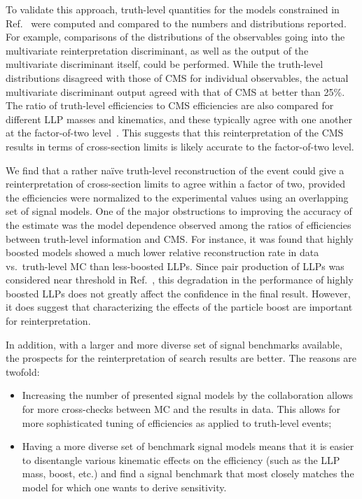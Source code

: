 To validate this approach, truth-level quantities for the models constrained in
Ref.~\cite{CMS-PAS-EXO-12-038} were computed and compared to the numbers and
distributions reported. For example,
comparisons of the distributions of the observables going into the multivariate reinterpretation
discriminant, as well as the output of the multivariate discriminant itself, could be
performed. While the truth-level distributions disagreed with those of CMS for
individual observables, the actual multivariate discriminant output agreed with
that of CMS at better than 25\%. The ratio of truth-level efficiencies to CMS
efficiencies are also compared for different LLP masses and kinematics, and
these typically agree with one another at the factor-of-two
level~\cite{Cui:2014twa}. This suggests that this reinterpretation of the CMS
results in terms of cross-section limits is likely accurate to the factor-of-two level.

\vskip 0.1in
\vskip 0.1in

We find that a rather na\"ive truth-level reconstruction of the event could give a reinterpretation of cross-section limits to agree within a factor of two, provided the efficiencies were normalized to the experimental values using an overlapping set of signal models. One of the major obstructions to improving the accuracy of the estimate was the model dependence observed among the ratios of efficiencies between truth-level information and CMS. For instance, it was found that highly boosted models showed a much lower relative reconstruction rate in data vs.~truth-level MC than less-boosted LLPs. Since pair production of LLPs was considered near threshold in Ref.~\cite{Cui:2014twa}, this degradation in the performance of highly boosted LLPs does not greatly affect the confidence in the final result. However, it does suggest that characterizing the effects of the particle boost are important for reinterpretation.

In addition, with a larger and more diverse set of signal benchmarks available, the prospects for the reinterpretation of search results are better. The reasons are twofold:~
%
\begin{itemize}
\item Increasing the number of presented signal models by the collaboration allows for more cross-checks between MC and the results in data. This allows for more sophisticated tuning of efficiencies as applied to truth-level events;
\item Having a more diverse set of benchmark signal models means that it is easier to disentangle various kinematic effects on the efficiency (such as the LLP mass, boost, etc.) and find a signal benchmark that most closely matches the model for which one wants to derive sensitivity.
\end{itemize}
%

